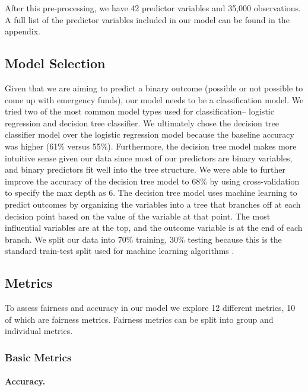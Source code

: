 \documentclass[water,article,submit,moreauthors,pdftex]{mdpi}
\begin{document}
After this pre-processing, we have 42 predictor variables and 35,000
observations. A full list of the predictor variables included in our
model can be found in the appendix.

\hypertarget{model-selection}{%
\subsection{Model Selection}\label{model-selection}}

Given that we are aiming to predict a binary outcome (possible or not
possible to come up with emergency funds), our model needs to be a
classification model. We tried two of the most common model types used
for classification-- logistic regression and decision tree classifier.
We ultimately chose the decision tree classifier model over the logistic
regression model because the baseline accuracy was higher (61\% versus
55\%). Furthermore, the decision tree model makes more intuitive sense
given our data since most of our predictors are binary variables, and
binary predictors fit well into the tree structure. We were able to
further improve the accuracy of the decision tree model to 68\% by using
cross-validation to specify the max depth as 6. The decision tree model
uses machine learning to predict outcomes by organizing the variables
into a tree that branches off at each decision point based on the value
of the variable at that point. The most influential variables are at the
top, and the outcome variable is at the end of each branch. We split our
data into 70\% training, 30\% testing because this is the standard
train-test split used for machine learning algorithms
\citep{nguyen2021influence}.

\hypertarget{metrics}{%
\subsection{Metrics}\label{metrics}}

To assess fairness and accuracy in our model we explore 12 different
metrics, 10 of which are fairness metrics. Fairness metrics can be split
into group and individual metrics.

\hypertarget{basic-metrics}{%
\subsubsection{Basic Metrics}\label{basic-metrics}}

\hypertarget{accuracy.}{%
\paragraph{Accuracy.}\label{accuracy.}}
\end{document}
